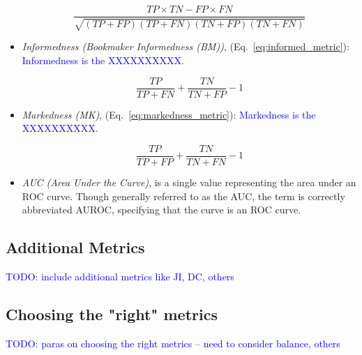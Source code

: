 \begin{itemize}
\begin{equation}
{\frac{TP \times TN - FP \times FN}{\sqrt{(TP + FP)(TP + FN)(TN + FP)(TN + FN)}}}
\label{eq:mcc_metric}
\end{equation}

\item \textit{Informedness (Bookmaker Informedness (BM))}, (Eq.~\ref{eq:informed_metric}): \textcolor{blue}{Informedness is the XXXXXXXXXX}.

\begin{equation}
{\frac{TP}{TP+FN}+\frac{TN}{TN+FP}-1}
\label{eq:informed_metric}
\end{equation}

\item \textit{Markedness (MK)}, (Eq.~\ref{eq:markedness_metric}): \textcolor{blue}{Markedness is the XXXXXXXXXX}.

\begin{equation}
{\frac{TP}{TP+FP}+\frac{TN}{TN+FN}-1}
\label{eq:markedness_metric}
\end{equation}



\item \textit{AUC (Area Under the Curve)}, is a single value representing the area under an ROC curve. Though generally referred to as the AUC, the term is correctly abbreviated AUROC, specifying that the curve is an ROC curve.
\end{itemize}


\subsection{Additional Metrics}

\textcolor{blue}{TODO: include additional metrics like JI, DC, others}

\subsection{Choosing the "right" metrics}

\textcolor{blue}{TODO: paras on choosing the right metrics -- need to consider balance, others}

